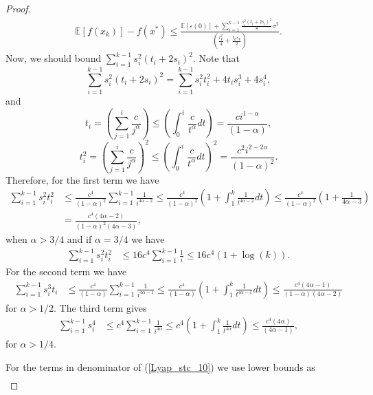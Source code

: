 \documentclass{article}
\theoremstyle{plain}
\theoremstyle{definition}
\theoremstyle{remark}
\begin{document}
\begin{proof}
        \begin{align}\label{Lyap_stc_10}
            \mathbb E[f(x_k)]-f(x^*) \leq \frac{\mathbb E[\varepsilon(0)] + \sum_{i=1}^{k-1} \frac{s_i^2(t_i+2s_i)^2}{8}\sigma^2}{(\frac{t_k^2}{4}+\frac{t_{k}s_k}{2})}.
        \end{align}
        Now, we should bound $\sum_{i=1}^{k-1} s_i^2(t_i+2s_i)^2$. Note that 
        $$\sum_{i=1}^{k-1} s_i^2(t_i+2s_i)^2=\sum_{i=1}^{k-1} s_i^2t_i^2+4t_is_i^3+4s_i^4,$$
        and
        $$t_i=\left(\sum_{j=1}^i\frac{c}{j^{\alpha}}\right)\leq \left(\int_{0}^{i} \frac{c}{t^{\alpha}}dt\right)=\frac{ci^{1-\alpha}}{(1-\alpha)},$$
        $$t_i^2=\left(\sum_{j=1}^i\frac{c}{j^{\alpha}}\right)^2\leq \left(\int_{0}^{i} \frac{c}{t^{\alpha}}dt\right)^2=\frac{c^2i^{2-2\alpha}}{(1-\alpha)^2}.$$
        Therefore, for the first term we have 
        \begin{align}\label{Lyap_stc_11}
            \sum_{i=1}^{k-1} s_i^2t_i^2&\leq \frac{c^4}{(1-\alpha)^2}\sum_{i=1}^{k-1} \frac{1}{i^{4\alpha -2}}\leq \frac{c^4}{(1-\alpha)^2}(1+\int_{1}^{k} \frac{1}{t^{4\alpha -2}}dt)\leq \frac{c^4}{(1-\alpha)^2}(1+\frac{1}{4\alpha-3})\nonumber\\
            &=\frac{c^4(4\alpha -2)}{(1-\alpha)^2(4\alpha-3)},
        \end{align}
        when $\alpha > 3/4$ and if $\alpha=3/4$ we have
        \begin{align}\label{Lyap_stc_12}
            \sum_{i=1}^{k-1} s_i^2t_i^2&\leq 16c^4\sum_{i=1}^{k-1}\frac{1}{i}\leq 16c^4(1+\log (k)).
        \end{align}
        For the second term we have
        \begin{align}\label{Lyap_stc_13}
            \sum_{i=1}^{k-1} s_i^3t_i&\leq \frac{c^4}{(1-\alpha)}\sum_{i=1}^{k-1} \frac{1}{i^{4\alpha -1}}\leq \frac{c^4}{(1-\alpha)}(1+\int_1^k\frac{1}{t^{4\alpha -1}}dt)\leq \frac{c^4(4\alpha -1)}{(1-\alpha)(4\alpha -2)}
         \end{align}
         for $\alpha > 1/2$. The third term gives
        \begin{align}\label{Lyap_stc_14}
            \sum_{i=1}^{k-1} s_i^4&\leq c^4\sum_{i=1}^{k-1} \frac{1}{i^{4\alpha }}\leq c^4(1+\int_1^k\frac{1}{t^{4\alpha }}dt)\leq \frac{c^4(4\alpha )}{(4\alpha -1)},
         \end{align} 
         for $\alpha > 1/4$.\par
         For the terms in denominator of (\ref{Lyap_stc_10}) we use lower bounds as
         \begin{align}\label{Lyap_stc_15}

\end{align}
\end{proof}
\end{document}
